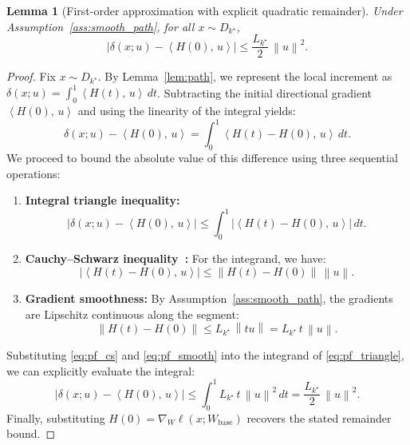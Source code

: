 \documentclass{article}
\theoremstyle{plain}
\newtheorem{lemma}{Lemma}
\theoremstyle{definition}
\theoremstyle{remark}
\numberwithin{theorem}{section}
\numberwithin{definition}{section}
\numberwithin{remark}{section}
\numberwithin{lemma}{section}
\numberwithin{assumption}{section}
\newcommand{\ip}[2]{\left\langle #1,\,#2 \right\rangle}
\newcommand{\norm}[1]{\left\lVert #1 \right\rVert}
\newcommand{\tindex}{k^\star}
\newcommand{\utarget}{u}
\begin{document}
\begin{lemma}[First-order approximation with explicit quadratic remainder]
\label{lem:quad_error}
Under Assumption~\ref{ass:smooth_path}, for all $x\sim D_{\tindex}$,
\begin{equation}
\label{eq:delta_linear_bound}
\big|\delta(x;\utarget) - \ip{H(0)}{\utarget}\big|
\le \frac{L_{\tindex}}{2}\,\norm{\utarget}^2.
\end{equation}
\end{lemma}

\begin{proof}
Fix $x\sim D_{\tindex}$.
By Lemma~\ref{lem:path}, we represent the local increment as $\delta(x;\utarget)=\int_0^1 \ip{H(t)}{\utarget}\,dt$.
Subtracting the initial directional gradient $\ip{H(0)}{\utarget}$ and using the linearity of the integral yields:
\[
\delta(x;\utarget)-\ip{H(0)}{\utarget}
=\int_0^1 \ip{H(t)-H(0)}{\utarget}\,dt.
\]
We proceed to bound the absolute value of this difference using three sequential operations:
\begin{enumerate}[leftmargin=*]
    \item \textbf{Integral triangle inequality:} 
    \begin{equation}
    \label{eq:pf_triangle}
    \Big|\delta(x;\utarget)-\ip{H(0)}{\utarget}\Big|
    \le \int_0^1 \Big|\ip{H(t)-H(0)}{\utarget}\Big|\,dt.
    \end{equation}
    
    \item \textbf{Cauchy--Schwarz inequality~\cite{steele2004cauchy}:} For the integrand, we have:
    \begin{equation}
    \label{eq:pf_cs}
    \Big|\ip{H(t)-H(0)}{\utarget}\Big|
    \le \norm{H(t)-H(0)}\,\norm{\utarget}.
    \end{equation}
    
    \item \textbf{Gradient smoothness:} By Assumption~\ref{ass:smooth_path}, the gradients are Lipschitz continuous along the segment:
    \begin{equation}
    \label{eq:pf_smooth}
    \norm{H(t)-H(0)} \le L_{\tindex}\,\norm{t\utarget}=L_{\tindex}\,t\,\norm{\utarget}.
    \end{equation}
\end{enumerate}

\noindent Substituting \eqref{eq:pf_cs} and \eqref{eq:pf_smooth} into the integrand of \eqref{eq:pf_triangle}, we can explicitly evaluate the integral:
\[
\Big|\delta(x;\utarget)-\ip{H(0)}{\utarget}\Big|
\le \int_0^1 L_{\tindex}\,t\,\norm{\utarget}^2\,dt
= \frac{L_{\tindex}}{2}\,\norm{\utarget}^2.
\]
Finally, substituting $H(0)=\nabla_W \ell(x;W_{\mathrm{base}})$ recovers the stated remainder bound.
\end{proof}
\end{document}
